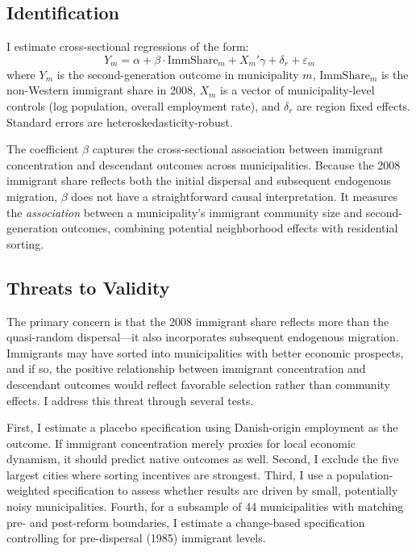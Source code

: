 \documentclass[12pt]{article}
\begin{document}
\subsection{Identification}

I estimate cross-sectional regressions of the form:
\begin{equation}
Y_m = \alpha + \beta \cdot \text{ImmShare}_m + X_m'\gamma + \delta_r + \varepsilon_m
\label{eq:main}
\end{equation}
where $Y_m$ is the second-generation outcome in municipality $m$, $\text{ImmShare}_m$ is the non-Western immigrant share in 2008, $X_m$ is a vector of municipality-level controls (log population, overall employment rate), and $\delta_r$ are region fixed effects. Standard errors are heteroskedasticity-robust.

The coefficient $\beta$ captures the cross-sectional association between immigrant concentration and descendant outcomes across municipalities. Because the 2008 immigrant share reflects both the initial dispersal and subsequent endogenous migration, $\beta$ does not have a straightforward causal interpretation. It measures the \textit{association} between a municipality's immigrant community size and second-generation outcomes, combining potential neighborhood effects with residential sorting.

\subsection{Threats to Validity}

The primary concern is that the 2008 immigrant share reflects more than the quasi-random dispersal---it also incorporates subsequent endogenous migration. Immigrants may have sorted into municipalities with better economic prospects, and if so, the positive relationship between immigrant concentration and descendant outcomes would reflect favorable selection rather than community effects. I address this threat through several tests.

First, I estimate a placebo specification using Danish-origin employment as the outcome. If immigrant concentration merely proxies for local economic dynamism, it should predict native outcomes as well. Second, I exclude the five largest cities where sorting incentives are strongest. Third, I use a population-weighted specification to assess whether results are driven by small, potentially noisy municipalities. Fourth, for a subsample of 44 municipalities with matching pre- and post-reform boundaries, I estimate a change-based specification controlling for pre-dispersal (1985) immigrant levels.
\end{document}
